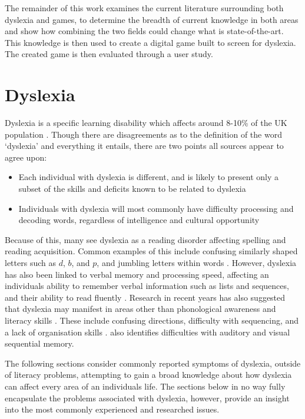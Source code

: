 \documentclass[journal]{IEEEtran}
\begin{document}
The remainder of this work examines the current literature surrounding both dyslexia and games, to determine the breadth of current knowledge in both areas and show how combining the two fields could change what is state-of-the-art. This knowledge is then used to create a digital game built to screen for dyslexia. The created game is then evaluated through a user study.

\section{Dyslexia}
\label{sec:dyslexia}

Dyslexia is a specific learning disability which affects around 8-10\% of the UK population \cite{Nhs,bda}. Though there are disagreements as to the definition of the word `dyslexia' and everything it entails, there are two points all sources appear to agree upon:
\begin{itemize}
\item Each individual with dyslexia is different, and is likely to present only a
	subset of the skills and deficits known to be related to dyslexia 
\item Individuals with dyslexia will most commonly have difficulty processing
	and decoding words, regardless of intelligence and cultural opportunity
\end{itemize}

Because of this, many see dyslexia as a reading disorder affecting spelling and reading acquisition. Common examples of this include confusing similarly shaped letters such as $d$, $b$, and $p$, and jumbling letters within words \cite{DetectAndManage}. However, dyslexia has also been linked to verbal memory and processing speed, affecting an individuals ability to remember verbal information such as lists and sequences, and their ability to read fluently \cite{Nhs, RoseReview}. Research in recent years has also suggested that dyslexia may manifest in areas other than phonological awareness and literacy skills \cite{snowling, DetectAndManage}.  These include confusing directions, difficulty with sequencing, and a lack of organisation skills \cite{bda}. \cite{DetectAndManage} also identifies difficulties with auditory and visual sequential memory.

The following sections consider commonly reported symptoms of dyslexia, outside of literacy problems, attempting to gain a broad knowledge about how dyslexia can affect every area of an individuals life. The sections below in no way fully encapsulate the problems associated with dyslexia, however, provide an insight into the most commonly experienced and researched issues. 
\end{document}
